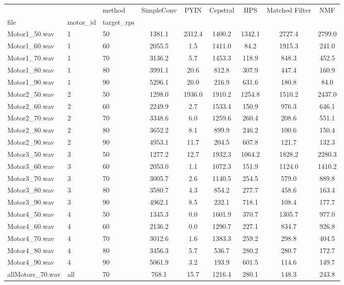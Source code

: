 \begin{tabular}{lllcccccc}
\toprule
 &  & method & SimpleConv & PYIN & Cepstral & HPS & Matched Filter & NMF \\
file & motor_id & target_rps &  &  &  &  &  &  \\
\midrule
Motor1\_50.wav & 1 & 50 & 1381.1 & 2312.4 & 1400.2 & 1342.1 & 2727.4 & 2799.0 \\
\cline{1-9} \cline{2-9}
Motor1\_60.wav & 1 & 60 & 2055.5 & 1.5 & 1411.0 & 84.2 & 1915.3 & 241.0 \\
\cline{1-9} \cline{2-9}
Motor1\_70.wav & 1 & 70 & 3136.2 & 5.7 & 1453.3 & 118.9 & 848.3 & 452.5 \\
\cline{1-9} \cline{2-9}
Motor1\_80.wav & 1 & 80 & 3991.1 & 20.6 & 812.8 & 307.9 & 447.4 & 160.9 \\
\cline{1-9} \cline{2-9}
Motor1\_90.wav & 1 & 90 & 5296.1 & 20.0 & 216.9 & 631.6 & 180.8 & 84.0 \\
\cline{1-9} \cline{2-9}
Motor2\_50.wav & 2 & 50 & 1298.0 & 1936.0 & 1910.2 & 1254.8 & 1510.2 & 2437.0 \\
\cline{1-9} \cline{2-9}
Motor2\_60.wav & 2 & 60 & 2249.9 & 2.7 & 1533.4 & 150.9 & 976.3 & 646.1 \\
\cline{1-9} \cline{2-9}
Motor2\_70.wav & 2 & 70 & 3348.6 & 6.0 & 1259.6 & 260.4 & 208.6 & 551.1 \\
\cline{1-9} \cline{2-9}
Motor2\_80.wav & 2 & 80 & 3652.2 & 8.1 & 899.9 & 246.2 & 100.6 & 150.4 \\
\cline{1-9} \cline{2-9}
Motor2\_90.wav & 2 & 90 & 4953.1 & 11.7 & 204.5 & 607.8 & 121.7 & 132.3 \\
\cline{1-9} \cline{2-9}
Motor3\_50.wav & 3 & 50 & 1277.2 & 12.7 & 1932.3 & 1064.2 & 1828.2 & 2280.3 \\
\cline{1-9} \cline{2-9}
Motor3\_60.wav & 3 & 60 & 2053.0 & 1.1 & 1072.3 & 151.9 & 1124.0 & 1410.2 \\
\cline{1-9} \cline{2-9}
Motor3\_70.wav & 3 & 70 & 3005.7 & 2.6 & 1140.5 & 254.5 & 579.0 & 889.8 \\
\cline{1-9} \cline{2-9}
Motor3\_80.wav & 3 & 80 & 3580.7 & 4.3 & 854.2 & 277.7 & 458.6 & 163.4 \\
\cline{1-9} \cline{2-9}
Motor3\_90.wav & 3 & 90 & 4962.1 & 8.5 & 232.1 & 718.1 & 108.4 & 177.7 \\
\cline{1-9} \cline{2-9}
Motor4\_50.wav & 4 & 50 & 1345.3 & 0.0 & 1601.9 & 370.7 & 1305.7 & 977.0 \\
\cline{1-9} \cline{2-9}
Motor4\_60.wav & 4 & 60 & 2136.2 & 0.0 & 1290.7 & 227.1 & 834.7 & 926.8 \\
\cline{1-9} \cline{2-9}
Motor4\_70.wav & 4 & 70 & 3012.6 & 1.6 & 1383.3 & 259.2 & 298.8 & 404.5 \\
\cline{1-9} \cline{2-9}
Motor4\_80.wav & 4 & 80 & 3456.3 & 5.7 & 536.7 & 280.2 & 280.7 & 172.7 \\
\cline{1-9} \cline{2-9}
Motor4\_90.wav & 4 & 90 & 5061.9 & 3.2 & 193.9 & 601.5 & 114.6 & 149.7 \\
\cline{1-9} \cline{2-9}
allMotors\_70.wav & all & 70 & 768.1 & 15.7 & 1216.4 & 280.1 & 148.3 & 243.8 \\
\cline{1-9} \cline{2-9}
\bottomrule
\end{tabular}

